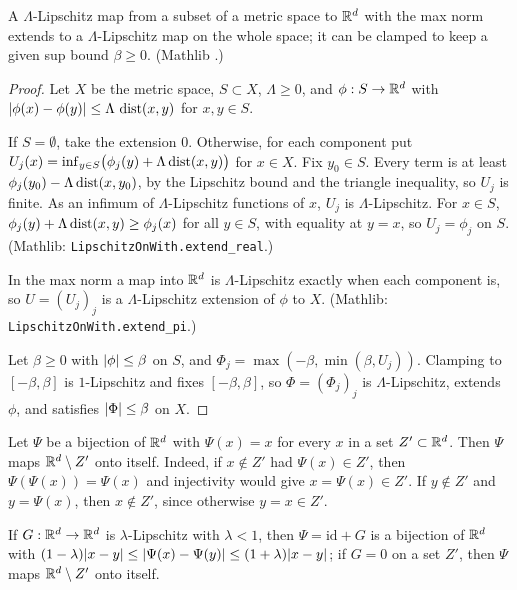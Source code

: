 \begin{lemma}\label{bp:p1:mcshane}
A $\Lambda$-Lipschitz map from a subset of a metric space to $\mathbb{R}^d$ with the max norm extends to a $\Lambda$-Lipschitz map on
the whole space; it can be clamped to keep a given sup bound $\beta\ge0$. (Mathlib .)
\end{lemma}

\begin{proof}
Let $X$ be the metric space, $S\subset X$, $\Lambda\ge0$, and $\phi:S\to\mathbb{R}^d$ with
$\lvert \phi(x)-\phi(y)\rvert\le\Lambda\,\operatorname{dist}(x,y)$ for $x,y\in S$.

\label{step:p1:mc-component}
If $S=\emptyset$, take the extension $0$. Otherwise, for each component put
$U_j(x)=\inf_{y\in S}\bigl(\phi_j(y)+\Lambda\operatorname{dist}(x,y)\bigr)$ for $x\in X$. Fix $y_0\in S$. Every term is at
least $\phi_j(y_0)-\Lambda\operatorname{dist}(x,y_0)$, by the Lipschitz bound and the triangle inequality, so $U_j$ is
finite. As an infimum of $\Lambda$-Lipschitz functions of $x$, $U_j$ is $\Lambda$-Lipschitz. For $x\in S$,
$\phi_j(y)+\Lambda\operatorname{dist}(x,y)\ge\phi_j(x)$ for all $y\in S$, with equality at $y=x$, so $U_j=\phi_j$ on $S$.
(Mathlib: \nolinkurl{LipschitzOnWith.extend_real}.)

\label{step:p1:mc-components}
In the max norm a map into $\mathbb{R}^d$ is $\Lambda$-Lipschitz exactly when each component is, so
$U=(U_j)_j$ is a $\Lambda$-Lipschitz extension of $\phi$ to $X$. (Mathlib:
\nolinkurl{LipschitzOnWith.extend_pi}.)

\label{step:p1:mc-clamp}
Let $\beta\ge0$ with $\lvert \phi\rvert\le\beta$ on $S$, and $\Phi_j=\max(-\beta,\min(\beta,U_j))$. Clamping to $[-\beta,\beta]$ is
$1$-Lipschitz and fixes $[-\beta,\beta]$, so $\Phi=(\Phi_j)_j$ is $\Lambda$-Lipschitz, extends $\phi$, and
satisfies $\lvert \Phi\rvert\le\beta$ on $X$.
\end{proof}

\begin{remark}\label{bp:p1:lipeo-fixed}
Let $\Psi$ be a bijection of $\mathbb{R}^d$ with $\Psi(x)=x$ for every $x$ in a set $Z'\subset\mathbb{R}^d$. Then $\Psi$ maps
$\mathbb{R}^d\setminus Z'$ onto itself. Indeed, if $x\notin Z'$ had $\Psi(x)\in Z'$, then $\Psi(\Psi(x))=\Psi(x)$ and
injectivity would give $x=\Psi(x)\in Z'$. If $y\notin Z'$ and $y=\Psi(x)$, then $x\notin Z'$, since
otherwise $y=x\in Z'$.
\end{remark}

\begin{lemma}[Lipeomorphisms]\label{bp:p1:lipeo}
If $G:\mathbb{R}^d\to\mathbb{R}^d$ is $\lambda$-Lipschitz with $\lambda<1$, then $\Psi=\mathrm{id}+G$ is a bijection of $\mathbb{R}^d$
with $(1-\lambda)\lvert x-y\rvert\le\lvert \Psi(x)-\Psi(y)\rvert\le(1+\lambda)\lvert x-y\rvert$; if $G=0$ on a set $Z'$, then
$\Psi$ maps $\mathbb{R}^d\setminus Z'$ onto itself.
\end{lemma}

